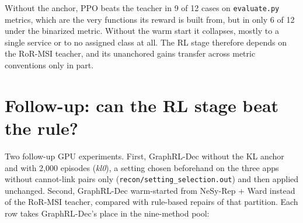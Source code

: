 \documentclass[10pt,a4paper]{article}
\begin{document}
Without the anchor, PPO beats the teacher in 9 of 12 cases on \texttt{evaluate.py} metrics, which are the very functions its reward is built from, but in only 6 of 12 under the binarized metric. Without the warm start it collapses, mostly to a single service or to no assigned class at all. The RL stage therefore depends on the RoR-MSI teacher, and its unanchored gains transfer across metric conventions only in part.
\section{Follow-up: can the RL stage beat the rule?}
Two follow-up GPU experiments. First, GraphRL-Dec without the KL anchor and with 2,000 episodes (\emph{kl0}), a setting chosen beforehand on the three apps without cannot-link pairs only (\texttt{recon/setting\_selection.out}) and then applied unchanged. Second, GraphRL-Dec warm-started from NeSy-Rep + Ward instead of the RoR-MSI teacher, compared with rule-based repairs of that partition. Each row takes GraphRL-Dec's place in the nine-method pool:
\end{document}
